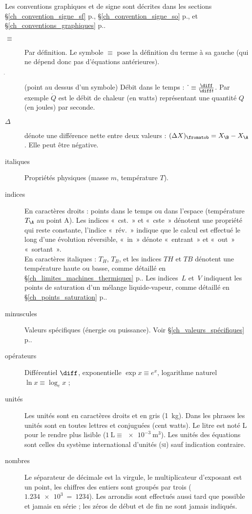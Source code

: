 
\TabPositions{2cm}

Les conventions graphiques et de signe sont décrites dans les sections \S\ref{ch_convention_signe_sf} p.\pageref{ch_convention_signe_sf}, \S\ref{ch_convention_signe_so} p.\pageref{ch_convention_signe_so}, et \S\ref{ch_conventions_graphiques} p.\pageref{ch_conventions_graphiques}.

\begin{description}
	\item[$\equiv$] 	\tab Par définition. Le symbole $\equiv$ pose la définition du terme à sa gauche (qui ne dépend donc pas d’équations antérieures).
	\item[$\dot~$]		\tab (point au dessus d’un symbole) Débit dans le temps : $\dot~ \equiv \frac{\diff}{\diff t}$. Par exemple $\dot Q$ est le débit de chaleur (en \si{watts}) représentant une quantité $Q$ (en \si{joules}) par \si{seconde}.
	\item[$\Delta$]	\tab dénote une différence nette entre deux valeurs : $(\Delta X)_\fromatob = X_\B - X_\A$. Elle peut être négative.
	\item[italiques] 	Propriétés physiques (masse $m$, température $T$).
	\item[indices]		En caractères droits : points dans le temps ou dans l’espace (température~$T_\A$ au point A). Les indices «~cst.~» et «~cste~» dénotent une propriété qui reste constante, l’indice «~rév.~» indique que le calcul est effectué le long d’une évolution réversible, «~in~» dénote «~entrant~» et «~out~» «~sortant~».\\
							En caractères italiques : $T_H$, $T_B$, et les indices $TH$ et $TB$ dénotent une température haute ou basse, comme détaillé en \S\ref{ch_limites_machines_thermiques} p.\pageref{ch_limites_machines_thermiques}. Les indices~$L$ et~$V$ indiquent les points de saturation d’un mélange liquide-vapeur, comme détaillé en \S\ref{ch_points_saturation} p.\pageref{ch_points_saturation}.
	\item[minuscules]	Valeurs spécifiques (énergie ou puissance). Voir \S\ref{ch_valeurs_spécifiques} p.\pageref{ch_valeurs_spécifiques}.
	\item[opérateurs]	Différentiel $\diff$, exponentielle $\exp x \equiv e^x $, logarithme naturel $\ln x \equiv \log_e x$ ;
	\item[unités]		Les unités sont en caractères droits et en gris (\SI{1}{\kilogram}). Dans les phrases les unités sont en toutes lettres et conjuguées (cent \si{watts}). Le \si{litre} est noté \si{\liter} pour le rendre plus lisible ($\SI{1}{\liter} \equiv \SI{e-3}{\metre\cubed}$). Les unités des équations sont celles du système international d’unités (\textsc{si}) sauf indication contraire.
	\item[nombres]		Le séparateur de décimale est la virgule, le multiplicateur d’exposant est un point, les chiffres des entiers sont groupés par trois ($\SI{1,234e3} ~=~ \num{1234}$). Les arrondis sont effectués aussi tard que possible et jamais en série ; les zéros de début et de fin ne sont jamais indiqués.
\end{description}
